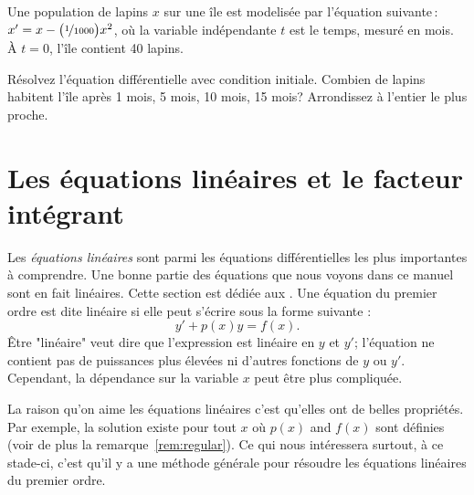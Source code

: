 \begin{exercise}
Une population de lapins $x$ sur une île est modelisée par l'équation suivante\,: 
$x' = x- \bigl(\nicefrac{1}{1000} \bigr) x^2$, où la variable indépendante $t$ est le temps, mesuré en mois.  À  $t=0$, l'île contient 40 lapins.
\begin{tasks}
\task Résolvez l'équation différentielle avec condition initiale.
\task 
Combien de lapins habitent l'île après 1 mois, 5 mois, 10 mois, 15 mois?  Arrondissez à l'entier le plus proche.
\end{tasks}
\end{exercise}


\sectionnewpage
\section{Les équations linéaires et le facteur intégrant}
\label{intfactor:section}


Les \emph{équations linéaires} sont parmi les équations différentielles les plus importantes à comprendre.  Une bonne partie des équations que nous voyons dans ce manuel sont en fait linéaires.  Cette section est dédiée aux \emph{}.
Une équation du premier ordre est dite linéaire si elle peut s'écrire sous la forme suivante :
\begin{equation} \label{lineq:eq1}
y' + p(x) y = f(x) .
\end{equation}
Être "linéaire" veut dire que l'expression est linéaire en $y$ et $y'$; l'équation ne contient pas de puissances plus élevées ni d'autres fonctions de $y$ ou $y'$.
Cependant, la dépendance sur la variable $x$ peut être plus compliquée.

La raison qu'on aime les équations linéaires c'est qu'elles ont de belles propriétés.  Par exemple, la solution existe pour tout $x$ où $p(x)$ and $f(x)$ sont définies (voir de plus la remarque~\ref{rem:regular}).  Ce qui nous intéressera surtout, à ce stade-ci, c'est qu'il y a une méthode générale pour résoudre les équations linéaires du premier ordre.

